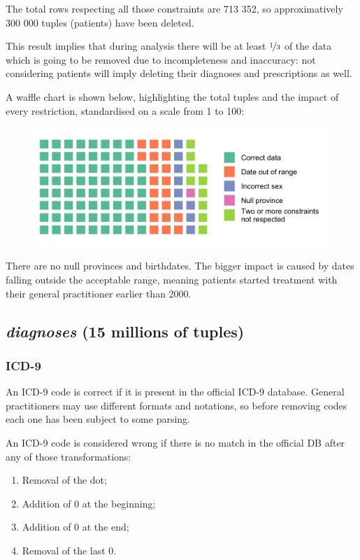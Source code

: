 The total rows respecting all those constraints are 713 352, so approximatively 300 000 tuples (patients) have been deleted. 

This result implies that during analysis there will be at least $\nicefrac{1}{3}$ of the data which is going to be removed due to incompleteness and inaccuracy: not considering patients will imply deleting their diagnoses and prescriptions as well.

A waffle chart is shown below, highlighting the total tuples and the impact of every restriction, standardised on a scale from 1 to 100:
\begin{figure}[h]
	\centering
	\includegraphics[scale=0.45]{../plots/patients-waffle.png}
\end{figure}

There are no null provinces and birthdates. The bigger impact is caused by dates falling outside the acceptable range, meaning patients started treatment with their general practitioner earlier than 2000.

\subsection{\textit{diagnoses} (15 millions of tuples)}
\subsubsection{ICD-9}
An ICD-9 code is correct if it is present in the official ICD-9 database\cite{icd9}. General practitioners may use different formats and notations, so before removing codes each one has been subject to some parsing.

An ICD-9 code is considered wrong if there is no match in the official DB after any of those transformations:
\begin{enumerate}
	\item Removal of the dot;
	\item Addition of 0 at the beginning;
	\item Addition of 0 at the end;
	\item Removal of the last 0.
\end{enumerate}

